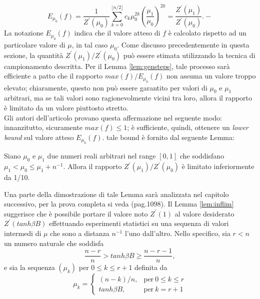 \begin{equation}
	E_{\mu_0}(f) = \frac{1}{Z^{\prime}(\mu_0)}\sum_{k=0}^{\lfloor n/2 \rfloor}{c_k \mu_0^{2k}}\left(\frac{\mu_1}{\mu_0}\right)^{2k} = \frac{Z^{\prime}(\mu_1)}{Z^{\prime}(\mu_0)}.
	\label{emu0f}
-\end{equation}
La notazione $E_{\mu_0}(f)$ indica che il valore atteso di $f$ è calcolato rispetto ad un particolare valore di $\mu$, in tal caso $\mu_0$. Come discusso precedentemente in questa sezione, la quantità $Z^{\prime}(\mu_1)/Z^{\prime}(\mu_0)$ può essere stimata utilizzando la tecnica di campionamento descritta. Per il Lemma \ref{lem:gensteps}, tale processo sarà efficiente a patto che il rapporto $max(f)/E_{\mu_0}(f)$ non assuma un valore troppo elevato; chiaramente, questo non può essere garantito per valori di $\mu_0$ e $\mu_1$ arbitrari, ma se tali valori sono ragionevolmente vicini tra loro, allora il rapporto è limitato da un valore piuttosto stretto.\\
Gli autori dell'articolo provano questa affermazione nel seguente modo: innanzitutto, sicuramente $max(f) \leq 1$; è sufficiente, quindi, ottenere un \textit{lower bound} sul valore atteso $E_{\mu_0}(f)$. tale bound è fornito dal seguente Lemma:
\begin{lem}
	Siano $\mu_0$ e $\mu_1$ due numeri reali arbitrari nel range $[0,1]$ che soddisfano $\mu_1 < \mu_0 \leq \mu_1 + n^{-1}$. Allora il rapporto $Z^{\prime}(\mu_1)/Z^{\prime}(\mu_0)$ è limitato inferiormente da 1/10.
	\label{lem:inflim}
\end{lem}
Una parte della dimostrazione di tale Lemma sarà analizzata nel capitolo successivo, per la prova completa si veda \cite{jerrum1993polynomial} (pag.1098).
Il Lemma \ref{lem:inflim} suggerisce che è possibile portare il valore noto $Z^{\prime}(1)$ al valore desiderato $Z^{\prime}(tanh\beta B)$ effettuando esperimenti statistici su una sequenza di valori intermedi di $\mu$ che sono a distanza $n^{-1}$ l'uno dall'altro.
Nello specifico, sia $r<n$ un numero naturale che soddisfa
\begin{equation}
	\frac{n-r}{n} > tanh\beta B \geq \frac{n - r - 1}{n},
	\label{tanh}
\end{equation}
e sia la sequenza $(\mu_k)$ per $0 \leq k \leq r + 1$ definita da
\begin{equation}
	\mu_k = 
	\begin{cases}
		(n-k)/n, & \text{per}\ 0 \leq k \leq r\\
		tanh\beta B, & \text{per}\ k = r + 1
	\end{cases}
	\label{muk}
\end{equation}
